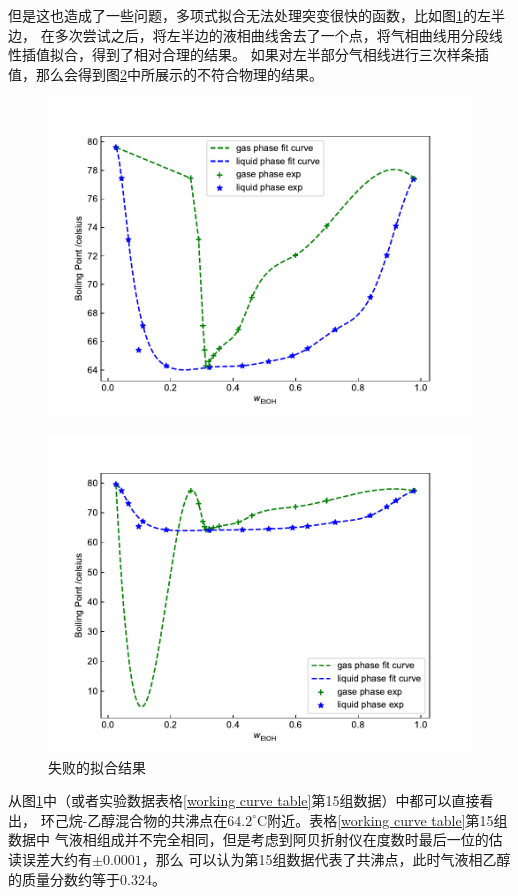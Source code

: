 \documentclass[12pt]{article}
\newcommand{\mr}[1]{\mathrm{#1}}
\def\celsius{^{\circ}\mr{C}}  %
\begin{document}
		但是这也造成了一些问题，多项式拟合无法处理突变很快的函数，比如图\ref{phase diagram}的左半边，
		在多次尝试之后，将左半边的液相曲线舍去了一个点，将气相曲线用分段线性插值拟合，得到了相对合理的结果。
		如果对左半部分气相线进行三次样条插值，那么会得到图\ref{phase diagram bad}中所展示的不符合物理的结果。
		\begin{figure}[htbp]
			\centering
			\includegraphics[scale=0.7]{phase_diagram.pdf}
			\label{phase diagram}
		\end{figure}
		\begin{figure}[htbp]
			\centering
			\includegraphics[scale=0.7]{phase_diagram_bad.pdf}
			\caption{失败的拟合结果}
			\label{phase diagram bad}
		\end{figure}
		\par 
		从图\ref{phase diagram}中（或者实验数据表格\ref{working curve table}第15组数据）中都可以直接看出，
		环己烷-乙醇混合物的共沸点在$64.2\celsius$附近。表格\ref{working curve table}第15组数据中
		气液相组成并不完全相同，但是考虑到阿贝折射仪在度数时最后一位的估读误差大约有$\pm0.0001$，那么
		可以认为第15组数据代表了共沸点，此时气液相乙醇的质量分数约等于0.324。
		\vbox{}  	
\end{document}
